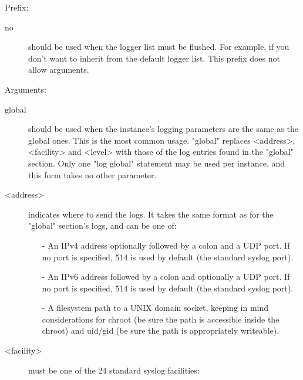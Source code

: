 
  Prefix:
  
\begin{description}
\item[no]
               should be used when the logger list must be flushed. For example,
               if you don't want to inherit from the default logger list. This
               prefix does not allow arguments.
\end{description}

  Arguments:

\begin{description}
\item[global]
               should be used when the instance's logging parameters are the
               same as the global ones. This is the most common usage. "global"
               replaces <address>, <facility> and <level> with those of the log
               entries found in the "global" section. Only one "log global"
               statement may be used per instance, and this form takes no other
               parameter.

\item[<address>]
               indicates where to send the logs. It takes the same format as
               for the "global" section's logs, and can be one of:
               
               \begin{itemize}
               \item[-] An IPv4 address optionally followed by a colon \chr{:} and a UDP
                 port. If no port is specified, 514 is used by default (the
                 standard syslog port).
               \item[-] An IPv6 address followed by a colon \chr{:} and optionally a UDP
                 port. If no port is specified, 514 is used by default (the
                 standard syslog port).
               \item[-] A filesystem path to a UNIX domain socket, keeping in mind
                 considerations for chroot (be sure the path is accessible
                 inside the chroot) and uid/gid (be sure the path is
                 appropriately writeable).
                 \end{itemize}

\item[<facility>] must be one of the 24 standard syslog facilities:



\end{description}

